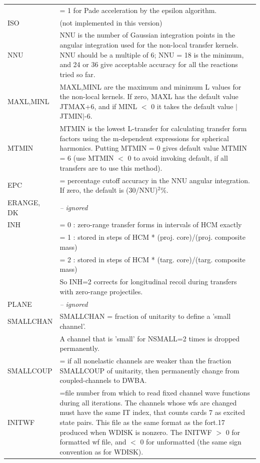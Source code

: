 \documentclass[11pt]{book}
\begin{document}
\begin{longtable}{| p{} | p{} |}
     &  = 1 for Pade acceleration by the epsilon algorithm. \\
ISO & (not implemented in this version)\\
NNU & NNU is the number of Gaussian integration points
in the angular
integration used for the non-local transfer kernels. NNU should
be a multiple of 6; NNU = 18 is the minimum, and 24 or 36 give
acceptable accuracy for all the reactions tried so far. \\
\hline
MAXL,MINL & MAXL,MINL are the maximum and minimum L values
for the non-local
kernels. If zero, MAXL has the default value JTMAX+6, and
if MINL $<$ 0 it takes the default value $|$JTMIN$|$-6.\\
MTMIN & MTMIN is the lowest L-transfer for calculating transfer form factors
using the m-dependent expressions for spherical harmonics.
Putting MTMIN = 0 gives default value MTMIN = 6 (use MTMIN $<$ 0 to avoid
invoking default, if all transfers are to use this method).
\\
EPC & = percentage cutoff accuracy in the
NNU angular integration.
If zero, the default is (30/NNU)$^2$\%.
 \\
ERANGE, DK & {\em -- ignored} \\
INH & = 0 : zero-range transfer forms in intervals of HCM exactly \\ 
    & = 1 : stored in steps of HCM * (proj. core)/(proj. composite mass)\\ 
    & = 2 : stored in steps of HCM * (targ. core)/(targ. composite mass)\\
    & So INH=2 corrects for longitudinal recoil during transfers with zero-range projectiles.
\\
PLANE & {\em -- ignored}\\
SMALLCHAN & SMALLCHAN = fraction of unitarity to define a 'small channel'.\\
          & A channel that is 'small' for NSMALL=2 times is dropped permanently. \\
SMALLCOUP & = if all nonelastic channels are weaker than the fraction
SMALLCOUP of unitarity, then permanently change from coupled-channels to DWBA.\\
INITWF & =file number from which to read fixed channel  wave functions during all iterations. The channels whose wfs are changed must have the same
IT  index, that counts cards 7 as excited state pairs.
This file as the same format as the fort.17 produced when WDISK is nonzero. 
The INITWF $>$ 0 for formatted wf file, and $<$ 0 for unformatted (the same sign convention as for WDISK).\\
\hline 
\end{longtable}
\end{document}
